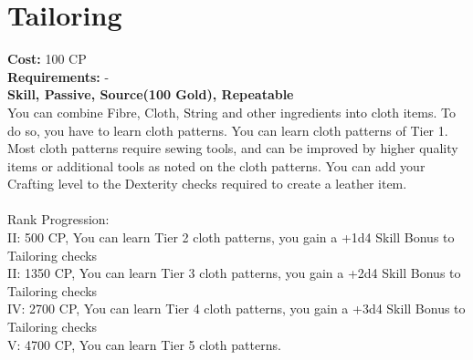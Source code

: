 \section{Tailoring}\label{perk:tailoring}
\textbf{Cost:} 100 CP\\
\textbf{Requirements:} -\\
\textbf{Skill, Passive, Source(100 Gold), Repeatable}\\
You can combine Fibre, Cloth, String and other ingredients into cloth items.
To do so, you have to learn cloth patterns.
You can learn cloth patterns of Tier 1.
Most cloth patterns require sewing tools, and can be improved by higher quality items or additional tools as noted on the cloth patterns.
You can add your Crafting level to the Dexterity checks required to create a leather item.\\
\\
Rank Progression:\\
II: 500 CP, You can learn Tier 2 cloth patterns, you gain a +1d4 Skill Bonus to Tailoring checks\\
II: 1350 CP, You can learn Tier 3 cloth patterns, you gain a +2d4 Skill Bonus to Tailoring checks\\
IV: 2700 CP, You can learn Tier 4 cloth patterns, you gain a +3d4 Skill Bonus to Tailoring checks\\
V: 4700 CP, You can learn Tier 5 cloth patterns.\\